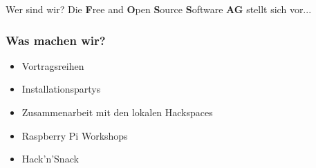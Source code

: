 \begin{frame}{Wer sind wir?}
	Die \textbf{F}ree and \textbf{O}pen \textbf{S}ource \textbf{S}oftware \textbf{AG} stellt sich vor... 
\end{frame}

\begin{frame}
	\frametitle{Was machen wir?}
	\begin{itemize}
		\item Vortragsreihen
		\item Installationspartys
		\item Zusammenarbeit mit den lokalen Hackspaces
		\item Raspberry Pi Workshops
		\item Hack'n'Snack
	\end{itemize}
\end{frame}
